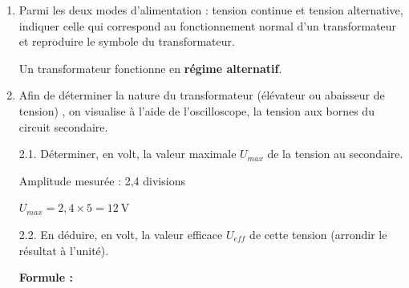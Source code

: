 \documentclass[11pt,a4paper]{article}
\begin{document}
\begin{enumerate}
    \item Parmi les deux modes d'alimentation : tension continue et tension alternative, indiquer celle qui correspond au fonctionnement normal d'un transformateur et reproduire le symbole du transformateur. 

\begin{tcolorbox}[colback=red!5!white,colframe=red!75!black]
Un transformateur fonctionne en \textbf{régime alternatif}. 

\end{tcolorbox}


\item Afin de déterminer la nature du transformateur (élévateur ou abaisseur de tension) , on visualise à l'aide de l'oscilloscope, la tension aux bornes du circuit secondaire. 

\noindent%
\begin{minipage}{.55\textwidth}%

    2.1. Déterminer, en volt, la valeur maximale $U_{max}$ de la tension au secondaire. 

\begin{tcolorbox}[colback=red!5!white,colframe=red!75!black]
Amplitude mesurée : 2,4 divisions
\vspace{2mm}

$U_{max} = 2,4 \times 5 = \boxed{12~\text{V}}$
\end{tcolorbox}

    2.2. En déduire, en volt, la valeur efficace $U_{eff}$ de cette tension (arrondir le résultat à l'unité). 

\begin{tcolorbox}[colback=red!5!white,colframe=red!75!black]
\textbf{Formule :}


\end{tcolorbox}
\end{minipage}
\end{enumerate}
\end{document}
